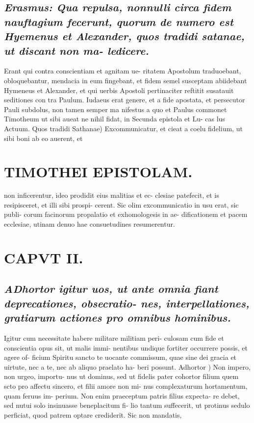 \documentclass{article}
\begin{document}
\begin{pages}
\subsection*{\textit{Erasmus: Qua repulsa, nonnulli circa fidem nauftagium fecerunt, quorum de numero est Hyemenus et Alexander, quos tradidi satanae, ut discant non ma- ledicere. }}\pstart Erant qui contra conscientiam et agnitam ue- ritatem Apostolum traduoebant, obloquebantur, mendacia in eum fingebant, et fidem semel susceptam abiidebant Hymeneus et Alexander, et qui uerbis Apostoli pertinaciter reftitit susatauit seditiones con tra Paulum. Iudaeus erat genere, et a fide apostata, et persecutor Pauli subdolus, non tamen semper ma nifestus a quo et Paulus commonet Timotheum ut sibi aueat ne nihil fidat, in Secunda epistola et Lu- cas lus Actuum.  \pend\pstart Quos tradidi Sathanae) Excommunicatur, et cieat a coelu fidelium, ut sibi boni ab eo auerent, et  \pend
\section*{TIMOTHEI EPISTOLAM. }
\marginpar{[ p.41 ]}\pstart non inficerentur, ideo prodidit eius malitias et ec- clesiae patefecit, et is resipisceret, et illi sibi prospi- cerent. Sic olim excommunicatio in usu erat, sic publi- corum facinorum propalatio et exhomologesis in ae- dificationem et pacem ecclesiae, utinam denuo hae consuetudines resumerentur.  \pend
\endnumbering\beginnumbering\section{CAPVT II.}
{}
\subsection*{\textit{\huge\textbf{A}\normalsize Dhortor igitur uos, ut ante omnia fiant deprecationes, obsecratio- nes, interpellationes, gratiarum actiones pro omnibus hominibus. }}\pstart Igitur cum necessitate habere militare militiam peri- culosam cum fide et conscientia opus sit, ut malis immi- nentibus undique fortiter occurrere possis, et agere of- ficium Spiritu sancto te uocante commissum, quae sine dei gracia et uirtute, nec a te, nec ab aliquo praelato ha- beri possunt.  \pend\pstart Adhortor ) Non impero, non urgeo, importu- nus ut dominus, sed ut fidelis pater cohortor filium quem scto pro affectu sincero, et filii amore non mi- nus complexaturum hortamentum, quam feruus im- perium. Non enim praeceptum patris filius expecta- re debet, sed nutui solo insinuasse beneplacitum fi- lio tantum suffecerit, ut protinus sedulo perficiat, quod patrem optare crediderit. Sic non mandatis,  \pend

\end{pages}
\end{document}
